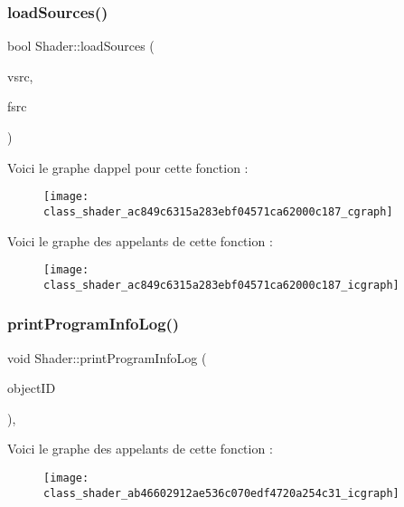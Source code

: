 \subsubsection{\texorpdfstring{load\+Sources()}{loadSources()}}
{\footnotesize\ttfamily bool Shader\+::load\+Sources (\begin{DoxyParamCaption}\item[{const std\+::string \&}]{vsrc,  }\item[{const std\+::string \&}]{fsrc }\end{DoxyParamCaption})}

Voici le graphe d\textquotesingle{}appel pour cette fonction \+:\nopagebreak
\begin{figure}[H]
\begin{center}
\leavevmode
\texttt{[image: class\_shader\_ac849c6315a283ebf04571ca62000c187\_cgraph]}
\end{center}
\end{figure}
Voici le graphe des appelants de cette fonction \+:\nopagebreak
\begin{figure}[H]
\begin{center}
\leavevmode
\texttt{[image: class\_shader\_ac849c6315a283ebf04571ca62000c187\_icgraph]}
\end{center}
\end{figure}
\mbox{\label{class_shader_ab46602912ae536c070edf4720a254c31}} 
\subsubsection{\texorpdfstring{print\+Program\+Info\+Log()}{printProgramInfoLog()}}
{\footnotesize\ttfamily void Shader\+::print\+Program\+Info\+Log (\begin{DoxyParamCaption}\item[{G\+Luint}]{object\+ID }\end{DoxyParamCaption})\hspace{0.3cm}{\ttfamily [static]}, {\ttfamily [protected]}}

Voici le graphe des appelants de cette fonction \+:\nopagebreak
\begin{figure}[H]
\begin{center}
\leavevmode
\texttt{[image: class\_shader\_ab46602912ae536c070edf4720a254c31\_icgraph]}
\end{center}
\end{figure}
\mbox{\label{class_shader_af36e2a57d8f789e95b7d014a8ddfaf97}} 

